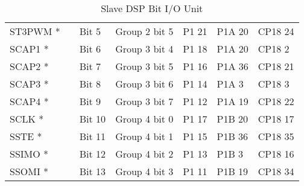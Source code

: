 \begin{table}[H]
\begin{adjustbox}{width=1\textwidth}
\begin{tabular}{|lllllll|}
\multicolumn{1}{|l|}{ST3PWM *} &
  \multicolumn{1}{l|}{} &
  \multicolumn{1}{l|}{Bit 5} &
  \multicolumn{1}{l|}{Group 2 bit 5} &
  \multicolumn{1}{l|}{P1 21} &
  \multicolumn{1}{l|}{P1A 20} &
  CP18 24 \\
\multicolumn{1}{|l|}{SCAP1 *} &
  \multicolumn{1}{l|}{} &
  \multicolumn{1}{l|}{Bit 6} &
  \multicolumn{1}{l|}{Group 3 bit 4} &
  \multicolumn{1}{l|}{P1 18} &
  \multicolumn{1}{l|}{P1A 20} &
  CP18 2 \\
\multicolumn{1}{|l|}{SCAP2 *} &
  \multicolumn{1}{l|}{} &
  \multicolumn{1}{l|}{Bit 7} &
  \multicolumn{1}{l|}{Group 3 bit 5} &
  \multicolumn{1}{l|}{P1 16} &
  \multicolumn{1}{l|}{P1A 36} &
  CP18 21 \\
\multicolumn{1}{|l|}{SCAP3 *} &
  \multicolumn{1}{l|}{} &
  \multicolumn{1}{l|}{Bit 8} &
  \multicolumn{1}{l|}{Group 3 bit 6} &
  \multicolumn{1}{l|}{P1 14} &
  \multicolumn{1}{l|}{P1A 3} &
  CP18 3 \\
\multicolumn{1}{|l|}{SCAP4 *} &
  \multicolumn{1}{l|}{} &
  \multicolumn{1}{l|}{Bit 9} &
  \multicolumn{1}{l|}{Group 3 bit 7} &
  \multicolumn{1}{l|}{P1 12} &
  \multicolumn{1}{l|}{P1A 19} &
  CP18 22 \\
\multicolumn{1}{|l|}{SCLK *} &
  \multicolumn{1}{l|}{} &
  \multicolumn{1}{l|}{Bit 10} &
  \multicolumn{1}{l|}{Group 4 bit 0} &
  \multicolumn{1}{l|}{P1 17} &
  \multicolumn{1}{l|}{P1B 20} &
  CP18 17 \\
\multicolumn{1}{|l|}{SSTE *} &
  \multicolumn{1}{l|}{} &
  \multicolumn{1}{l|}{Bit 11} &
  \multicolumn{1}{l|}{Group 4 bit 1} &
  \multicolumn{1}{l|}{P1 15} &
  \multicolumn{1}{l|}{P1B 36} &
  CP18 35 \\
\multicolumn{1}{|l|}{SSIMO *} &
  \multicolumn{1}{l|}{} &
  \multicolumn{1}{l|}{Bit 12} &
  \multicolumn{1}{l|}{Group 4 bit 2} &
  \multicolumn{1}{l|}{P1 13} &
  \multicolumn{1}{l|}{P1B 3} &
  CP18 16 \\
\multicolumn{1}{|l|}{SSOMI *} &
  \multicolumn{1}{l|}{} &
  \multicolumn{1}{l|}{Bit 13} &
  \multicolumn{1}{l|}{Group 4 bit 3} &
  \multicolumn{1}{l|}{P1 11} &
  \multicolumn{1}{l|}{P1B 19} &
  CP18 34 \\ \hline
\end{tabular}
\end{adjustbox}
\caption{Slave DSP Bit I/O Unit}
\label{Slave DSP Bit I/O Unit}
\end{table}